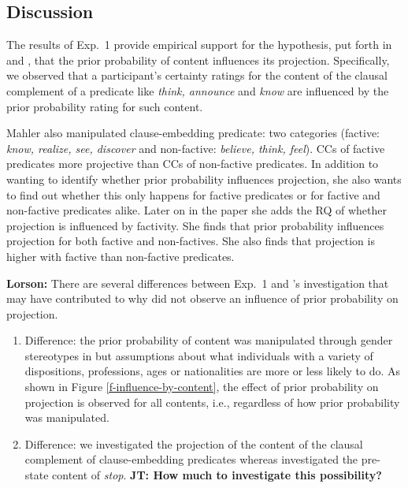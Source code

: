 \documentclass[11pt,fleqn]{article}
\newcommand{\6}{\mbox{$[\hspace*{-.6mm}[$}}
\newcommand{\9}{\mbox{$]\hspace*{-.6mm}]$}}
\newcommand{\citepos}[1]{\citeauthor{#1}'s \citeyear{#1}}
\newcommand{\jt}[1]{\textbf{\color{blue}JT: #1}}
\begin{document}
\subsection{Discussion}

The results of Exp.~1 provide empirical support for the hypothesis, put forth in \citealt{stevens-etal2017} and \citealt{tbd-variability}, that the prior probability of content influences its projection. Specifically, we observed that a participant's certainty ratings for the content of the clausal complement of a predicate like {\em think, announce} and {\em know} are influenced by the prior probability rating for such content.

Mahler also manipulated clause-embedding predicate: two categories (factive: {\em know, realize, see, discover} and non-factive: {\em believe, think, feel}). CCs of factive predicates more projective than CCs of non-factive predicates. In addition to wanting to identify whether prior probability influences projection, she also wants to find out whether this only happens for factive predicates or for factive and non-factive predicates alike. Later on in the paper she adds the RQ of whether projection is influenced by factivity. She finds that prior probability influences projection for both factive and non-factives.  She also finds that projection is higher with factive than non-factive predicates. 

{\bf Lorson:} There are several differences between Exp.~1 and \citepos{lorson2018} investigation that may have contributed to why \citealt{lorson2018} did not observe an influence of prior probability on projection. 

\begin{enumerate}

\item Difference: the prior probability of content was manipulated through gender stereotypes in \citealt{lorson2018} but assumptions about what individuals with a variety of dispositions, professions, ages or nationalities are more or less likely to do. As shown in Figure \ref{f-influence-by-content}, the effect of prior probability on projection is observed for all contents, i.e., regardless of how prior probability was manipulated.


\item Difference: we investigated the projection of the content of the clausal complement of clause-embedding predicates whereas \citealt{lorson2018} investigated the pre-state content of {\em stop}. \jt{How much to investigate this possibility?}

\end{enumerate}
\end{document}
